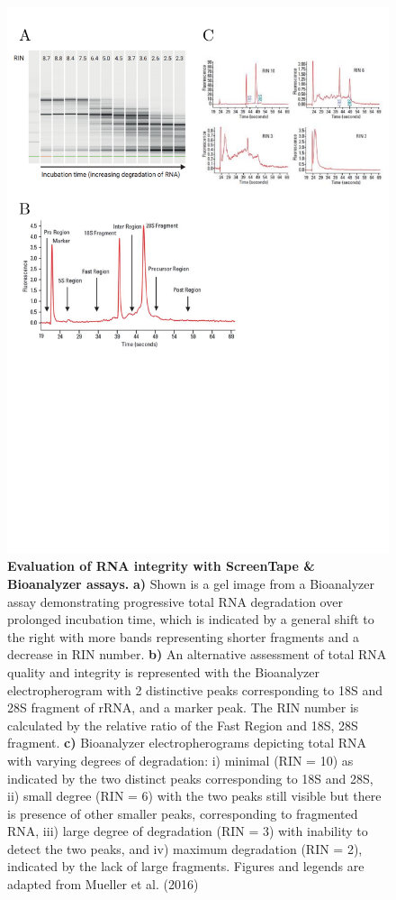 \begin{figure}[htp]
	\centering
	\vspace{20pt}
	\includegraphics[page=1,trim={0 10cm 0 0 },clip, scale = 0.7]{Figures/General_Methodology_Figures.pdf}
	\captionsetup{width=0.95\textwidth}
	\caption[Evaluation of RNA integrity with ScreenTape \& Bioanalyzer assays]%
	{\textbf{Evaluation of RNA integrity with ScreenTape \& Bioanalyzer assays.} \textbf{a)} Shown is a gel image from a Bioanalyzer assay demonstrating progressive total RNA degradation over prolonged incubation time, which is indicated by a general shift to the right with more bands representing shorter fragments and a decrease in RIN number. \textbf{b)} An alternative assessment of total RNA quality and integrity is represented with the Bioanalyzer electropherogram with 2 distinctive peaks corresponding to 18S and 28S fragment of rRNA, and a marker peak. The RIN number is calculated by the relative ratio of the Fast Region and 18S, 28S fragment. \textbf{c)} Bioanalyzer electropherograms depicting total RNA with varying degrees of degradation: i) minimal (RIN = 10) as indicated by the two distinct peaks corresponding to 18S and 28S, ii) small degree (RIN = 6) with the two peaks still visible but there is presence of other smaller peaks, corresponding to fragmented RNA, iii) large degree of degradation (RIN = 3) with inability to detect the two peaks, and iv) maximum degradation (RIN = 2), indicated by the lack of large fragments. Figures and legends are adapted from Mueller et al. (2016)}
	\label{fig:bionalayzer_pics}
\end{figure}

